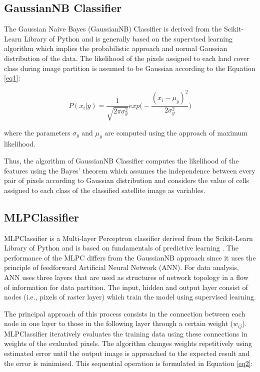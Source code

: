\documentclass[final,5p,times,twocolumn]{elsarticle}
\begin{document}
\subsection{GaussianNB Classifier}

The Gaussian Naive Bayes (GaussianNB) Classifier is derived from the Scikit-Learn Library of Python and is generally based on the supervised learning algorithm which implies the probabilistic approach and normal Gaussian distribution of the data. The likelihood of the pixels assigned to each land cover class during image partition is assumed to be Gaussian according to the Equation \ref{eq1}:

\begin{equation}
P(x_{i} | y)=\frac{1}{\sqrt{2\pi\sigma^2_y}}exp\biggl( -\frac{(x_{i}-\mu_{y})^2}{2\sigma^2_y}\biggr)
\label{eq1}
\end{equation}

where the parameters $\sigma_y$ and $\mu_y$  are computed using the approach of maximum likelihood.

Thus, the algorithm of GaussianNB Classifier computes the likelihood of the features using the Bayes' theorem which assumes the independence between every pair of pixels according to Gaussian distribution and considers the value of cells assigned to each class of the classified satellite image as variables. 

\subsection{MLPClassifier}

MLPClassifier is a Multi-layer Perceptron classifier derived from the Scikit-Learn Library of Python and is based on fundamentals of predictive learning \cite{Rosenblatt}. The performance of the MLPC differs from the GaussianNB approach since it uses the principle of feedforward Artificial Neural Network (ANN). For data analysis, ANN uses three layers that are used as structures of network topology in a flow of information for data partition. The input, hidden and output layer consist of nodes (i.e., pixels of raster layer) which train the model using supervised learning. 

The principal approach of this process consists in the connection between each node in one layer to those in the following layer through a certain weight ($w_{ij}$). MLPClassifier iteratively evaluates the training data using these connections in weights of the evaluated pixels. The algorithm changes weights repetitively using estimated error until the output image is approached to the expected result and the error is minimised. This sequential operation is formulated in Equation \ref{eq2}: 
\end{document}
